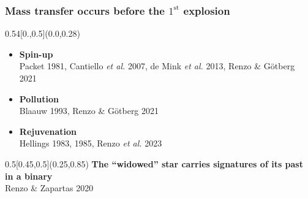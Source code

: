 \documentclass[xcolor=dvipsnames,professionalfonts, aspectratio=169]{beamer}
\begin{document}
\bgroup
{}
\begin{frame}[plain]


  \frametitle{\textcolor{white!80!Yellow}{Mass
      transfer occurs before the  $1^\mathrm{st}$ explosion}}
  \begin{textblock}{0.54}[0.,0.5](0.0,0.28)
    \centering
    \begin{itemize}
    \item[\textcolor{white!80!Yellow}{\textbullet}]
      \textcolor{white!80!Yellow}{\bf Spin-up}\\[-4pt]
      \textcolor{gray!50}{\tiny Packet 1981, Cantiello \emph{et al.}
        2007, de Mink \emph{et al.} 2013, Renzo \& G\"otberg 2021}\\[3pt]
    \item[\textcolor{white!80!Yellow}{\textbullet}]
      \textcolor{white!80!Yellow}{\bf Pollution}\\[-4pt]
      \textcolor{gray!50}{\tiny Blaauw 1993, Renzo \& G\"otberg 2021}\\[3pt]
    \item[\textcolor{white!80!Yellow}{\textbullet}]
      \textcolor{white!80!Yellow}{\bf Rejuvenation}\\[-4pt]
      \textcolor{gray!50}{\tiny Hellings 1983, 1985, Renzo \emph{et al.} 2023}
    \end{itemize}
  \end{textblock}
  \begin{textblock}{0.5}[0.45,0.5](0.25,0.85)
    \centering
    \textcolor{whiteish}{
      \bf The ``widowed'' star carries signatures of its past in a binary}\\[-2pt]
    \hfill\textcolor{gray!50}{\tiny Renzo \& Zapartas 2020}\ \,
  \end{textblock}
\end{frame}
\egroup
\end{document}

